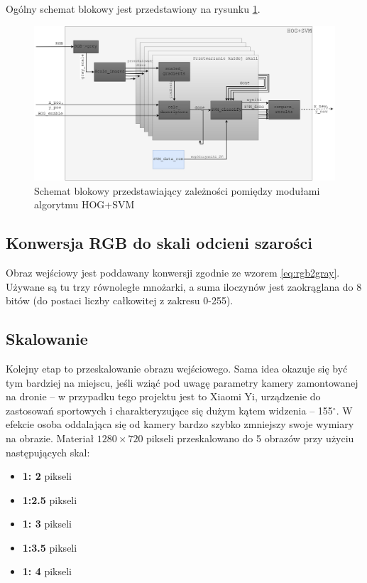 Ogólny schemat blokowy jest przedstawiony na rysunku \ref{fig:HOG_SVM_scheme}.
\begin{figure}[h]
	\centering
	\includegraphics[width=16cm]{HOG_SVM.png}
	\captionsetup{justification=centering,margin=1cm}
	\caption{Schemat blokowy przedstawiający zależności pomiędzy modułami algorytmu HOG+SVM}
	\label{fig:HOG_SVM_scheme}
\end{figure}
\subsection{Konwersja RGB do skali odcieni szarości}

Obraz wejściowy jest poddawany konwersji zgodnie ze wzorem \eqref{eq:rgb2gray}. 
Używane są tu trzy równoległe mnożarki, a suma iloczynów jest zaokrąglana do 8 bitów (do postaci liczby całkowitej z zakresu 0-255).

\subsection{Skalowanie}

Kolejny etap to przeskalowanie obrazu wejściowego. 
Sama idea okazuje się być tym bardziej na miejscu, jeśli wziąć pod uwagę parametry kamery zamontowanej na dronie -- w przypadku tego projektu jest to Xiaomi Yi, urządzenie do zastosowań sportowych i charakteryzujące się dużym kątem widzenia -- 155$^{\circ}$. %
W efekcie osoba oddalająca się od kamery bardzo szybko zmniejszy swoje wymiary na obrazie. 
Materiał $1280\times 720$ pikseli przeskalowano do 5 obrazów przy użyciu następujących skal:
\begin{itemize}
	\item \textbf{1:  2}\tab{:} pikseli
	\item \textbf{1:2.5}\tab{:} pikseli	
	\item \textbf{1:  3}\tab{:} pikseli
	\item \textbf{1:3.5}\tab{:} pikseli
	\item \textbf{1:  4}\tab{:} pikseli
\end{itemize}

